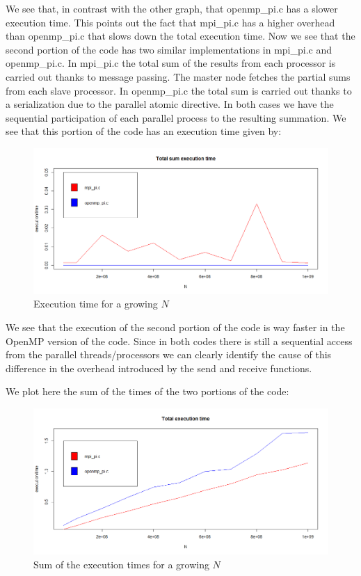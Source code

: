 \documentclass{article}
\begin{document}
We see that, in contrast with the other graph, that openmp\_pi.c has a slower execution time.
This points out the fact that mpi\_pi.c has a higher overhead than openmp\_pi.c that slows down the total execution time.
Now we see that the second portion of the code has two similar implementations in mpi\_pi.c and openmp\_pi.c.
In mpi\_pi.c the total sum of the results from each processor is carried out thanks to message passing. The master node fetches the partial sums from each slave processor.
 In openmp\_pi.c the total sum is carried out thanks to a serialization due to the parallel atomic directive.
In both cases we have the sequential participation of each parallel process to the resulting summation.
We see that this portion of the code has an execution time given by: 
\begin{figure}[H] %
	\centering
	\includegraphics[width=0.9\columnwidth]{graphs/pi_total_sum_execution_time} %
	\caption{Execution time for a growing $N$}
\end{figure}

We see that the execution of the second portion of the code is way faster in the OpenMP version of the code. 
Since in both codes there is still a sequential access from the parallel threads/processors we can clearly identify the cause of this difference in the overhead introduced by the send and receive functions.

We plot here the sum of the times of the two portions of the code:
\begin{figure}[H] %
	\centering
	\includegraphics[width=0.9\columnwidth]{graphs/pi_total_execution_time} %
	\caption{Sum of the execution times for a growing $N$}
	\label{fig:execution_time_total_graph}
\end{figure}
\end{document}
